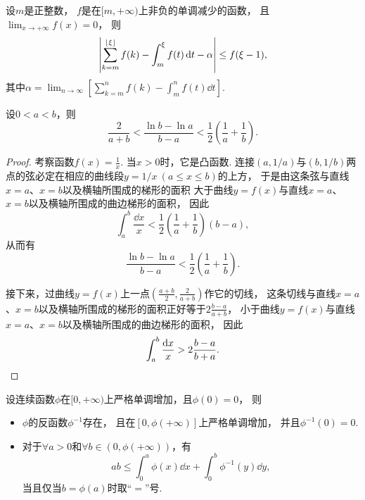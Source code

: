 \begin{corollary}
设\(m\)是正整数，
\(f\)是在\([m,+\infty)\)上非负的单调减少的函数，
且\(\lim_{x\to+\infty} f(x) = 0\)，
则\[
	\abs{
		\sum_{k=m}^{\lfloor\xi\rfloor} f(k)
		- \int_m^\xi f(t) \dd{t}
		- \alpha
	}
	\leq
	f(\xi-1),
\]
其中\(\alpha = \lim_{n\to\infty} \left[
	\sum_{k=m}^n f(k)
	- \int_m^n f(t) \dd{t}
\right]\).
\end{corollary}

\begin{proposition}
设\(0<a<b\)，则\begin{equation}
	\frac2{a+b}
	< \frac{\ln b - \ln a}{b - a}
	< \frac12 \left(\frac1a + \frac1b\right).
\end{equation}
\begin{proof}
考察函数\(f(x) = \frac1x\).
当\(x>0\)时，它是凸函数.
连接\((a,1/a)\)与\((b,1/b)\)两点的弦必定在相应的曲线段\(y=1/x\ (a \leq x \leq b)\)的上方，
于是由这条弦与直线\(x=a\)、\(x=b\)以及横轴所围成的梯形的面积
大于曲线\(y = f(x)\)与直线\(x=a\)、\(x=b\)以及横轴所围成的曲边梯形的面积，
因此\[
	\int_a^b \frac{\dd{x}}{x}
	< \frac12 \left( \frac1a + \frac1b \right) (b-a),
\]
从而有\[
	\frac{\ln b - \ln a}{b - a}
	< \frac12 \left( \frac1a + \frac1b \right).
\]

接下来，过曲线\(y = f(x)\)上一点\(\left( \frac{a+b}{2}, \frac{2}{a+b} \right)\)作它的切线，
这条切线与直线\(x=a\)、\(x=b\)以及横轴所围成的梯形的面积正好等于\(2\frac{b-a}{a+b}\)，
小于曲线\(y = f(x)\)与直线\(x=a\)、\(x=b\)以及横轴所围成的曲边梯形的面积，
因此\[
	\int_a^b \frac{\dd{x}}{x}
	> 2\frac{b-a}{b+a}.
	\qedhere
\]
\end{proof}
\end{proposition}

\begin{proposition}
设连续函数\(\phi\)在\([0,+\infty)\)上严格单调增加，且\(\phi(0) = 0\)，
则\begin{itemize}
	\item \(\phi\)的反函数\(\phi^{-1}\)存在，
	且在\([0,\phi(+\infty)]\)上严格单调增加，
	并且\(\phi^{-1}(0) = 0\).

	\item 对于\(\forall a>0\)和\(\forall b\in(0,\phi(+\infty))\)，有\begin{equation}
		a b \leq \int_0^a \phi(x) \dd{x} + \int_0^b \phi^{-1}(y) \dd{y},
	\end{equation}
	当且仅当\(b = \phi(a)\)时取“\(=\)”号.
\end{itemize}
\end{proposition}

